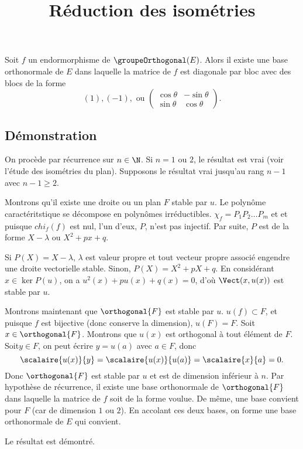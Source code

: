 \documentclass[fontsize=12pt,twoside=false,parskip=half, french]{scrartcl}
\title{Réduction des isométries}
\date{}
\author{}
\begin{document}
\maketitle
   \begin{Theoreme}
      Soit $f$ un endormorphisme de $\groupeOrthogonal(E)$. Alors il existe une base orthonormale de $E$ dans laquelle 
      la matrice de $f$ est diagonale par bloc avec des blocs de la forme
      \[
         (1), (-1), \text{ ou }
         \begin{pmatrix}
            \cos \theta & - \sin \theta \\
            \sin \theta & \cos \theta
         \end{pmatrix}.
      \]
   \end{Theoreme}
   \subsection{Démonstration}
      On procède par récurrence sur $n \in \N$. Si $n = 1$ ou $2$, le résultat est vrai (voir l’étude des isométries
      du plan). Supposons le résultat vrai jusqu’au rang $n - 1$ avec $n - 1 \geq 2$. 
      
      Montrons qu’il existe une droite ou un plan $F$ stable par $u$. Le polynôme caractéritstique se décompose en 
      polynômes irréductibles. $\chi_f = P_1P_2\ldots P_m$ et et puisque $chi_f(f)$ est nul, l’un d’eux, $P$, n’est 
      pas injectif. Par suite, $P$ est de la forme $X - \lambda$ ou $X^2 + px + q$. 
      
      Si $P(X) = X - \lambda$, $\lambda$ est valeur propre et tout vecteur propre associé engendre une droite 
      vectorielle stable. Sinon, $P(X) = X^2 + pX + q$. En considérant $x \in \ker P(u)$, on a $u^2(x) + pu(x) + q(x) = 0$,
      d’où $\Vect(x, u(x))$ est stable par $u$.
      
      Montrons maintenant que $\orthogonal{F}$ est stable par $u$. $u(f) \subset F$, et puisque $f$ est bijective 
      (donc conserve la dimension), $u(F) = F$. Soit $x \in \orthogonal{F}$. Montrons que $u(x)$ est orthogonal à 
      tout élément de $F$. Soit$y \in F$, on peut écrire $y = u(a)$ avec $a \in F$, donc
      \[
         \scalaire{u(x)}{y} = \scalaire{u(x)}{u(a)} = \scalaire{x}{a} = 0.
      \]
      Donc $\orthogonal{F}$ est stable par $u$ et est de dimension inférieur à $n$. Par hypothèse de récurrence, il 
      existe une base orthonormale de $\orthogonal{F}$ dans laquelle la matrice de $f$ soit de la forme voulue. De même,
      une base convient pour $F$ (car de dimension $1$ ou $2$). En accolant ces deux bases, on forme une base 
      orthonormale de $E$ qui convient.
      
      Le résultat est démontré.
\end{document}
